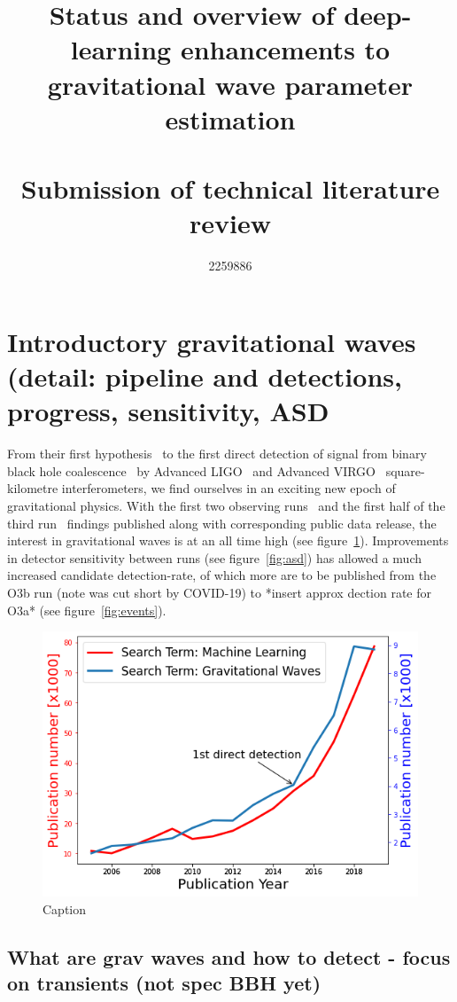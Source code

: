 \documentclass[11pt]{article}
\title{\bf{Status and overview of deep-learning enhancements to gravitational wave parameter estimation}\\~\\
\large Submission of technical literature review}
\author{2259886}
\begin{document}
\maketitle


\section*{Introductory gravitational waves (detail: pipeline and detections, progress, sensitivity, ASD}

From their first hypothesis~\cite{einstein1} to the first direct detection of signal from binary black hole coalescence~\cite{abbott2016observation} by Advanced LIGO~\cite{advancedLIGO} and Advanced VIRGO~\cite{advacnedVIRGO} square-kilometre interferometers, we find ourselves in an exciting new epoch of gravitational physics. With the first two observing runs~\cite{BBHO1,gwtc1} and the first half of the third run~\cite{gwtc2} findings published along with corresponding public data release, the interest in gravitational waves is at an all time high (see figure~\ref{fig:wos}). Improvements in detector sensitivity between runs (see figure~\ref{fig:asd}) has allowed a much increased candidate detection-rate, of which more are to be published from the O3b run (note was cut short by COVID-19) to *insert approx dection rate for O3a* (see figure~\ref{fig:events}).

\begin{figure}[t!]
    \centering
    \includegraphics[width=.6\linewidth]{shared_resources/shared_figs/wos.png}
    \caption{Caption}
    \label{fig:wos}
\end{figure}

\subsection*{What are grav waves and how to detect - focus on transients (not spec BBH yet)}
\end{document}
